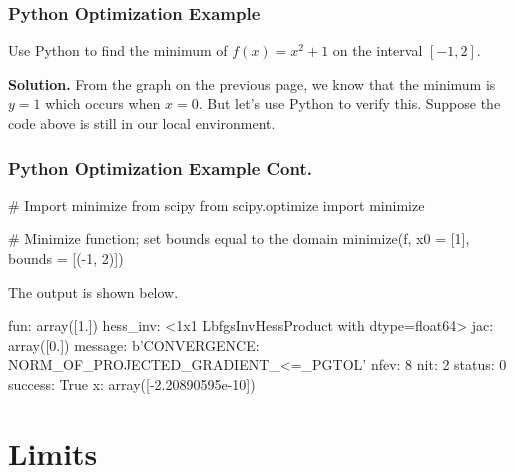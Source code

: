 \documentclass{beamer}
\begin{document}
\begin{frame}[fragile]
\frametitle{Python Optimization Example}
\begin{example}
Use Python to find the minimum of $f(x) = x^2 + 1$ on the interval $[-1, 2]$.
\end{example}

{\bf Solution.} From the graph on the previous page, we know that the minimum is $y = 1$ which occurs when $x = 0$. But let's use Python to verify this. Suppose the code above is still in our local environment. 

\end{frame}

\begin{frame}[fragile]
\frametitle{Python Optimization Example Cont.}

{
\linespread{0.8}
\small
\begin{verbatim*}
# Import minimize from scipy
from scipy.optimize import minimize

# Minimize function; set bounds equal to the domain
minimize(f, x0 = [1], bounds = [(-1, 2)])
\end{verbatim*}
}
The output is shown below. 
{
\linespread{0.8}
\small
\begin{verbatim*}
fun: array([1.])
 hess_inv: <1x1 LbfgsInvHessProduct with dtype=float64>
      jac: array([0.])
  message: b'CONVERGENCE: NORM_OF_PROJECTED_GRADIENT_<=_PGTOL'
     nfev: 8
      nit: 2
   status: 0
  success: True
        x: array([-2.20890595e-10])
\end{verbatim*}
}
\end{frame}

\section{Limits}

\end{document}
